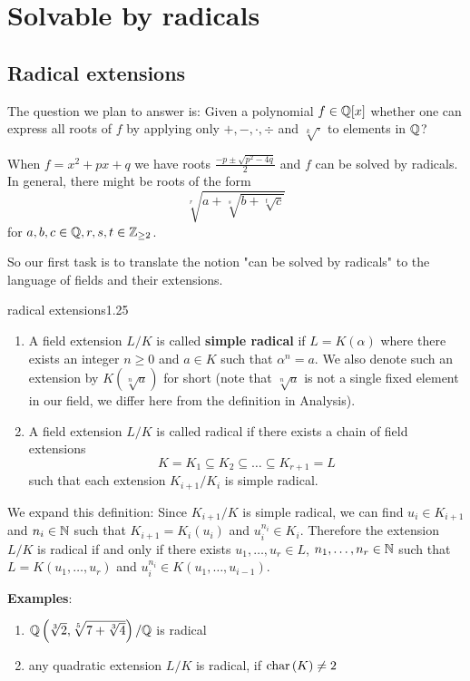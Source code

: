 \documentclass[twoside = false,	%
		headsepline,		%
		parskip = true,
		]{scrbook}						%
\begin{document}
%             
    
\section{Solvable by radicals}
    \subsection{Radical extensions}
        The question we plan to answer is: Given a polynomial $f\in\mathbb Q[x]$ whether one can express all roots of $f$ by applying only $+,-,\cdot,\div$ and $\sqrt[k]\cdot$ to elements in $\mathbb Q$?
        
        When $f=x^2+px+q$ we have roots $\frac{-p\pm\sqrt{p^2-4q}}2$ and $f$ can be solved by radicals. In general, there might be roots of the form $$\sqrt[r]{a+\sqrt[s]{b+\sqrt[t]{c}}}$$
        for $a,b,c\in\mathbb Q, r,s,t\in\mathbb Z_{\geq 2}$.
        
        So our first task is to translate the notion "can be solved by radicals" to the language of fields and their extensions.
        \begin{definition}{radical extensions}{1.25}
            \begin{enumerate}
                \item A field extension $L/K$ is called \textbf{simple radical} if $L=K(\alpha)$ where there exists an integer $n\geq 0$ and $a\in K$ such that $\alpha^n=a$. We also denote such an extension by $K(\sqrt[n]a)$ for short (note that $\sqrt[n]a$ is not a single fixed element in our field, we differ here from the definition in Analysis).
                \item A field extension $L/K$ is called radical if there exists a chain of field extensions $$K=K_1\subseteq K_2\subseteq\dots\subseteq K_{r+1}= L$$
                such that each extension $K_{i+1}/K_i$ is simple radical.
            \end{enumerate}
        \end{definition}
        We expand this definition: Since $K_{i+1}/K$ is simple radical, we can find $u_i\in K_{i+1}$ and $n_i\in\mathbb N$ such that $K_{i+1}=K_i(u_i)$ and $u_i^{n_i}\in K_i$. Therefore the extension $L/K$ is radical if and only if there exists $u_1,\dots,u_r\in L$, $n_1,\dots,n_r\in \mathbb N$ such that $L=K(u_1,\dots,u_r)$ and $u_i^{n_i}\in K(u_1,\dots,u_{i-1})$.
        
        \textbf{Examples}:
        \begin{enumerate}
            \item $\mathbb Q \left( \sqrt[3]2, \sqrt[5]{7+\sqrt[3]{4}} \right)/\mathbb Q$ is radical
            \item any quadratic extension $L/K$ is radical, if $\mathrm{char} \,(K) \neq 2$
        \end{enumerate}
\end{document}
